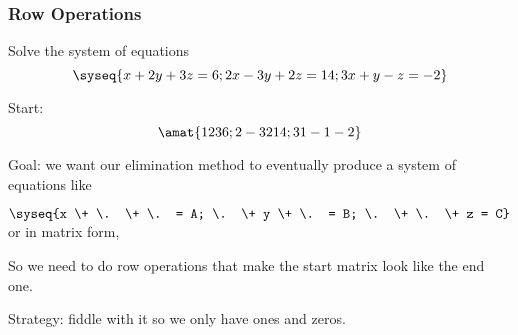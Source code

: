 
\begin{frame}
\frametitle{Row Operations}

\vskip-3mm
\begin{eg}
  Solve the system of equations
  \[\syseq{x + 2y + 3z = 6;
    2x - 3y + 2z = 14;
    3x + y - z = -2
  }\]
\end{eg}

\pause

Start:
\[\amat{
1   2   3   6 ;
2   -3   2   14 ;
3   1   -1   -2
}\]

\pause
\alert{Goal:} we want our elimination method to eventually produce a system of
equations like\\
\begin{center}
$\syseq{x \+ \. \+ \. = A; \. \+ y \+ \. = B; \. \+ \. \+ z = C}$
\pause
\hskip5mm or in matrix form,\hskip5mm
\end{center}
\pause
So we need to do row operations that make the start matrix look like the end
one.

\pause\smallskip
\alert{Strategy:} fiddle with it so we only have ones and zeros.
\end{frame}


